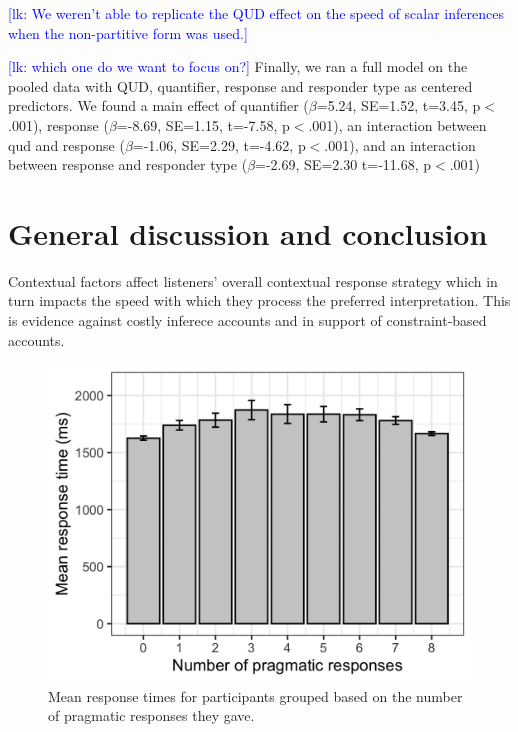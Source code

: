 \documentclass[10pt,letterpaper]{article}
\newcommand{\lk}[1]{\textcolor{Blue}{[lk: #1]}}
\begin{document}
\lk{
We weren't able to replicate the QUD effect on the speed of scalar inferences when the non-partitive form was used.}

\lk{which one do we want to focus on?}
Finally, we ran a full model on the pooled data with QUD, quantifier, response and responder type as centered predictors. We found a main effect of quantifier ($\beta$=5.24, SE=1.52, t=3.45, p$<$.001), response ($\beta$=-8.69, SE=1.15, t=-7.58, p$<$.001), an interaction between qud and response ($\beta$=-1.06, SE=2.29, t=-4.62, p$<$.001), and an interaction between response and responder type ($\beta$=-2.69, SE=2.30 t=-11.68, p$<$.001)



\section{General discussion and conclusion}

Contextual factors affect listeners' overall contextual response strategy which in turn impacts the speed with which they process the preferred interpretation. This is evidence against costly inferece accounts and in support of constraint-based accounts.

\begin{figure}
  \includegraphics[width=\columnwidth]{plots/consistency.png}
  \caption{Mean response times for participants grouped based on the number of pragmatic responses they gave. \label{fig:consistency}}
\end{figure}
\end{document}

